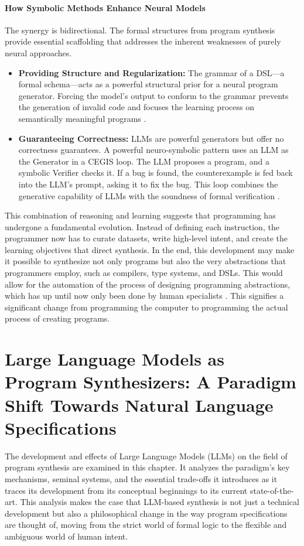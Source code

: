 \documentclass[12pt, a4paper]{report}
\begin{document}
\subsubsection{How Symbolic Methods Enhance Neural Models}
The synergy is bidirectional. The formal structures from program synthesis provide essential scaffolding that addresses the inherent weaknesses of purely neural approaches.
\begin{itemize}
    \item \textbf{Providing Structure and Regularization:} The grammar of a DSL---a formal schema---acts as a powerful structural prior for a neural program generator. Forcing the model's output to conform to the grammar prevents the generation of invalid code and focuses the learning process on semantically meaningful programs \citep{parisotto2017neurosymbolic}.
    \item \textbf{Guaranteeing Correctness:} LLMs are powerful generators but offer no correctness guarantees. A powerful neuro-symbolic pattern uses an LLM as the Generator in a CEGIS loop. The LLM proposes a program, and a symbolic Verifier checks it. If a bug is found, the counterexample is fed back into the LLM's prompt, asking it to fix the bug. This loop combines the generative capability of LLMs with the soundness of formal verification \citep{zhang2023fusing}.
\end{itemize}

This combination of reasoning and learning suggests that programming has undergone a fundamental evolution. Instead of defining each instruction, the programmer now has to curate datasets, write high-level intent, and create the learning objectives that direct synthesis. In the end, this development may make it possible to synthesize not only programs but also the very abstractions that programmers employ, such as compilers, type systems, and DSLs. This would allow for the automation of the process of designing programming abstractions, which has up until now only been done by human specialists \citep{ellis2021dreamcoder}. This signifies a significant change from programming the computer to programming the actual process of creating programs.

\chapter{Large Language Models as Program Synthesizers: A Paradigm Shift Towards Natural Language Specifications}
\label{chap:llm}

The development and effects of Large Language Models (LLMs) on the field of program synthesis are examined in this chapter. It analyzes the paradigm's key mechanisms, seminal systems, and the essential trade-offs it introduces as it traces its development from its conceptual beginnings to its current state-of-the-art. This analysis makes the case that LLM-based synthesis is not just a technical development but also a philosophical change in the way program specifications are thought of, moving from the strict world of formal logic to the flexible and ambiguous world of human intent.
\end{document}
